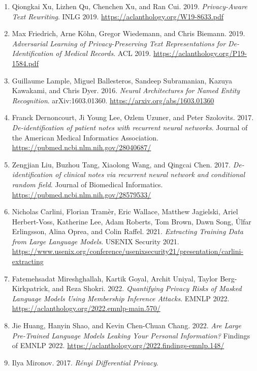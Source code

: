 \begin{enumerate}
  \emph{Privacy-preserving Neural Representations of Text}. EMNLP 2018.
  \url{https://aclanthology.org/D18-1001/}
\item
  Qiongkai Xu, Lizhen Qu, Chenchen Xu, and Ran Cui. 2019.
  \emph{Privacy-Aware Text Rewriting}. INLG 2019.
  \url{https://aclanthology.org/W19-8633.pdf}
\item
  Max Friedrich, Arne Köhn, Gregor Wiedemann, and Chris Biemann. 2019.
  \emph{Adversarial Learning of Privacy-Preserving Text Representations
  for De-Identification of Medical Records}. ACL 2019.
  \url{https://aclanthology.org/P19-1584.pdf}
\item
  Guillaume Lample, Miguel Ballesteros, Sandeep Subramanian, Kazuya
  Kawakami, and Chris Dyer. 2016. \emph{Neural Architectures for Named
  Entity Recognition}. arXiv:1603.01360.
  \url{https://arxiv.org/abs/1603.01360}
\item
  Franck Dernoncourt, Ji Young Lee, Ozlem Uzuner, and Peter Szolovits.
  2017. \emph{De-identification of patient notes with recurrent neural
  networks}. Journal of the American Medical Informatics Association.
  \url{https://pubmed.ncbi.nlm.nih.gov/28040687/}
\item
  Zengjian Liu, Buzhou Tang, Xiaolong Wang, and Qingcai Chen. 2017.
  \emph{De-identification of clinical notes via recurrent neural network
  and conditional random field}. Journal of Biomedical Informatics.
  \url{https://pubmed.ncbi.nlm.nih.gov/28579533/}
\item
  Nicholas Carlini, Florian Tramèr, Eric Wallace, Matthew Jagielski,
  Ariel Herbert-Voss, Katherine Lee, Adam Roberts, Tom Brown, Dawn Song,
  Úlfar Erlingsson, Alina Oprea, and Colin Raffel. 2021.
  \emph{Extracting Training Data from Large Language Models}. USENIX
  Security 2021.
  \url{https://www.usenix.org/conference/usenixsecurity21/presentation/carlini-extracting}
\item
  Fatemehsadat Mireshghallah, Kartik Goyal, Archit Uniyal, Taylor
  Berg-Kirkpatrick, and Reza Shokri. 2022. \emph{Quantifying Privacy
  Risks of Masked Language Models Using Membership Inference Attacks}.
  EMNLP 2022. \url{https://aclanthology.org/2022.emnlp-main.570/}
\item
  Jie Huang, Hanyin Shao, and Kevin Chen-Chuan Chang. 2022. \emph{Are
  Large Pre-Trained Language Models Leaking Your Personal Information?}
  Findings of EMNLP 2022.
  \url{https://aclanthology.org/2022.findings-emnlp.148/}
\item
  Ilya Mironov. 2017. \emph{Rényi Differential Privacy}.

\end{enumerate}
